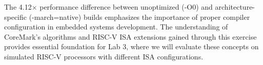 \documentclass[11pt,a4paper]{article}
\begin{document}
The 4.12× performance difference between unoptimized (-O0) and architecture-specific (-march=native) builds emphasizes the importance of proper compiler configuration in embedded systems development. The understanding of CoreMark's algorithms and RISC-V ISA extensions gained through this exercise provides essential foundation for Lab 3, where we will evaluate these concepts on simulated RISC-V processors with different ISA configurations.
\end{document}
